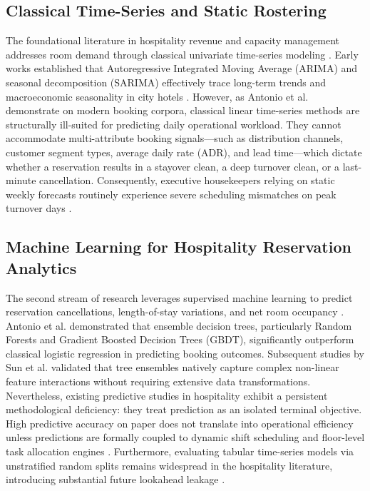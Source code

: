 \documentclass[11pt,a4paper]{article}
\begin{document}
\subsection{Classical Time-Series and Static Rostering}
The foundational literature in hospitality revenue and capacity management addresses room demand through classical univariate time-series modeling \cite{weatherford2003}. Early works established that Autoregressive Integrated Moving Average (ARIMA) and seasonal decomposition (SARIMA) effectively trace long-term trends and macroeconomic seasonality in city hotels \cite{ampountolas2023}. However, as Antonio et al. \cite{antonio2019} demonstrate on modern booking corpora, classical linear time-series methods are structurally ill-suited for predicting daily operational workload. They cannot accommodate multi-attribute booking signals—such as distribution channels, customer segment types, average daily rate (ADR), and lead time—which dictate whether a reservation results in a stayover clean, a deep turnover clean, or a last-minute cancellation. Consequently, executive housekeepers relying on static weekly forecasts routinely experience severe scheduling mismatches on peak turnover days \cite{chan2013}.

\subsection{Machine Learning for Hospitality Reservation Analytics}
The second stream of research leverages supervised machine learning to predict reservation cancellations, length-of-stay variations, and net room occupancy \cite{antonio2017,law2019}. Antonio et al. \cite{antonio2017} demonstrated that ensemble decision trees, particularly Random Forests and Gradient Boosted Decision Trees (GBDT), significantly outperform classical logistic regression in predicting booking outcomes. Subsequent studies by Sun et al. \cite{sun2022} validated that tree ensembles natively capture complex non-linear feature interactions without requiring extensive data transformations. Nevertheless, existing predictive studies in hospitality exhibit a persistent methodological deficiency: they treat prediction as an isolated terminal objective. High predictive accuracy on paper does not translate into operational efficiency unless predictions are formally coupled to dynamic shift scheduling and floor-level task allocation engines \cite{sainaghi2021}. Furthermore, evaluating tabular time-series models via unstratified random splits remains widespread in the hospitality literature, introducing substantial future lookahead leakage \cite{antonio2019}.
\end{document}
